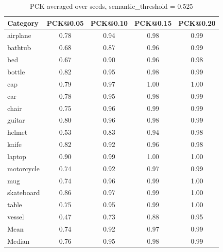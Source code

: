 \begin{table}[h]
\centering
\caption{PCK averaged over seeds, semantic\_threshold = 0.525}
\label{tab:pck_thresh_0_95}
\begin{tabular}{lcccc}
\toprule
Category & PCK@0.05 & PCK@0.10 & PCK@0.15 & PCK@0.20 \\
\midrule
airplane & 0.78 & 0.94 & 0.98 & 0.99 \\
bathtub & 0.68 & 0.87 & 0.96 & 0.99 \\
bed & 0.67 & 0.90 & 0.96 & 0.98 \\
bottle & 0.82 & 0.95 & 0.98 & 0.99 \\
cap & 0.79 & 0.97 & 1.00 & 1.00 \\
car & 0.78 & 0.95 & 0.98 & 0.99 \\
chair & 0.75 & 0.96 & 0.99 & 0.99 \\
guitar & 0.80 & 0.96 & 0.98 & 0.99 \\
helmet & 0.53 & 0.83 & 0.94 & 0.98 \\
knife & 0.82 & 0.92 & 0.96 & 0.98 \\
laptop & 0.90 & 0.99 & 1.00 & 1.00 \\
motorcycle & 0.74 & 0.92 & 0.97 & 0.99 \\
mug & 0.74 & 0.96 & 0.99 & 1.00 \\
skateboard & 0.86 & 0.97 & 0.99 & 1.00 \\
table & 0.75 & 0.95 & 0.99 & 1.00 \\
vessel & 0.47 & 0.73 & 0.88 & 0.95 \\
\midrule
Mean & 0.74 & 0.92 & 0.97 & 0.99 \\
Median & 0.76 & 0.95 & 0.98 & 0.99 \\
\bottomrule
\end{tabular}
\end{table}

